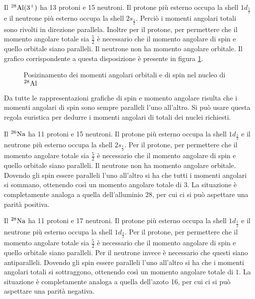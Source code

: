 \documentclass[../main.tex]{subfiles}
\begin{document}
\begin{svol}
	Il $ ^{28}\mathrm{Al}(3^{+}) $ ha 13 protoni e 15 neutroni. Il protone più esterno occupa la shell $ 1d_{\frac{5}{2}} $ e il neutrone più esterno occupa la shell $ 2s_{\frac{1}{2}} $. Perciò i momenti angolari totali sono rivolti in direzione parallela. Inoltre per il protone, per permettere che il momento angolare totale sia $ \frac{5}{2} $ è necessario che il momento angolare di spin e quello orbitale siano paralleli. Il neutrone non ha momento angolare orbitale. Il grafico corrispondente a questa disposizione è presente in figura \ref{fig:28Al}.
	
	\begin{figure}[h]
		\centering
		\caption{Posizinamento dei momenti angolari orbitali e di spin nel nucleo di $ ^{28}\mathrm{Al} $}\label{fig:28Al}
	\end{figure}
	
	Da tutte le rappresentazioni grafiche di spin e momento angolare risulta che i momenti angolari di spin sono sempre paralleli l'uno all'altro. Si può usare questa regola euristica per dedurre i momenti angolari di totali dei nuclei richiesti.
	
	Il $ ^{26}\mathrm{Na} $ ha 11 protoni e 15 neutroni. Il protone più esterno occupa la shell $ 1d_{\frac{5}{2}} $ e il neutrone più esterno occupa la shell $ 2s_{\frac{1}{2}} $. Per il protone, per permettere che il momento angolare totale sia $ \frac{5}{2} $ è necessario che il momento angolare di spin e quello orbitale siano paralleli. Il neutrone non ha momento angolare orbitale. Dovendo gli spin essere paralleli l'uno all'altro si ha che tutti i momenti angolari si sommano, ottenendo così un momento angolare totale di $ 3 $. La situazione è completamente analoga a quella dell'alluminio 28, per cui ci si può aspettare una parità positiva.
	
	Il $ ^{28}\mathrm{Na} $ ha 11 protoni e 17 neutroni. Il protone più esterno occupa la shell $ 1d_{\frac{5}{2}} $ e il neutrone più esterno occupa la shell $ 1d_{\frac{3}{2}} $. Per il protone, per permettere che il momento angolare totale sia $ \frac{5}{2} $ è necessario che il momento angolare di spin e quello orbitale siano paralleli. Per il neutrone invece è necessario che questi siano antiparalleli. Dovendo gli spin essere paralleli l'uno all'altro si ha che i momenti angolari totali si sottraggono, ottenendo così un momento angolare totale di $ 1 $. La situazione è completamente analoga a quella dell'azoto 16, per cui ci si può aspettare una parità negativa.
	
	\end{svol}
\end{document}
